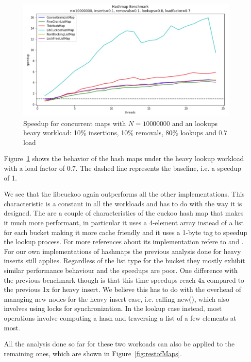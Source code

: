 \documentclass[11pt]{article}
\begin{document}
\begin{figure}[!htb]
\centering
\includegraphics[width=1.0\linewidth]{figs/patricio/latedays/lookups_heavy.jpg}
\caption{
Speedup for concurrent maps with $N=10000000$ and an lookups heavy workload:
10\% insertions, 10\% removals, 80\% lookups and 0.7 load}
\label{fig:mapLookupsHeavy}
\end{figure}

Figure~\ref{fig:mapLookupsHeavy} shows the behavior of the hash maps under the
heavy lookup workload with a load factor of 0.7. The dashed line represents
the baseline, i.e. a speedup of 1.

We see that the libcuckoo again outperforms all the other implementations. This characteristic
is a constant in all the workloads and has to do with the way it is designed. The are a
couple of characteristics of the cuckoo hash map that makes it much more performant, in particular
it uses a 4-element array instead of a list for each bucket making it more cache friendly and 
it uses a 1-byte tag to speedup the lookup process. For more references about its implementation refere 
to \cite{Andersen} and \cite{Andersen2}.
For our own implementations of hashmaps the previous analysis done for heavy 
inserts still applies. Regardless of the list type for the bucket they mostly exhibit similar
performance behaviour and the speedups are poor. One difference with the
previous benchmark though is that this time speedups reach 4x compared to the previous 1x for
heavy insert. We believe this has to do with the overhead of managing new nodes for the heavy
insert case, i.e. calling new(), which also involves using locks for synchronization.
In the lookup case instead, most operations involve computing a hash and traversing a list of a
few elements at most.

All the analysis done so far for these two workoads can also be applied to the remaining ones, 
which are shown in Figure~\ref{fig:restofMaps}.
\end{document}
